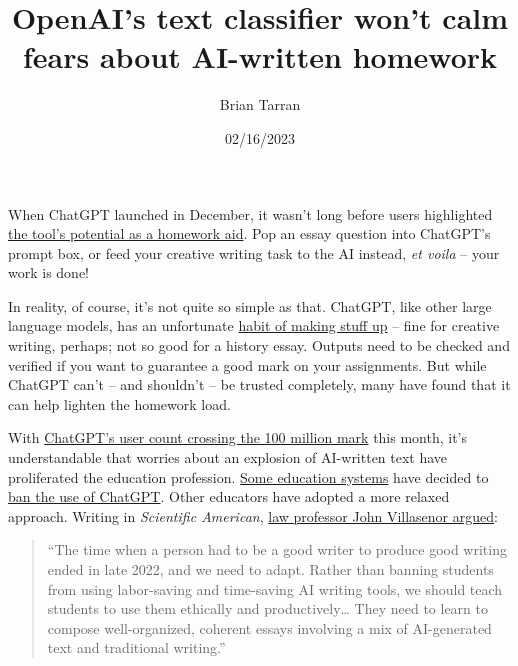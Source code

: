 \documentclass[
  letterpaper,
  DIV=11,
  numbers=noendperiod,
  oneside]{scrartcl}
\title{OpenAI's text classifier won't calm fears about AI-written
homework}
\author{Brian Tarran}
\date{02/16/2023}
\renewcommand*\contentsname{Table of contents}
\newcommand\contentsname{Table of contents}
\begin{document}
\maketitle
\ifdefined\Shaded\renewenvironment{Shaded}{\begin{tcolorbox}[boxrule=0pt, borderline west={3pt}{0pt}{shadecolor}, enhanced, frame hidden, interior hidden, sharp corners, breakable]}{\end{tcolorbox}}\fi

\renewcommand*\contentsname{Table of contents}
{
\hypersetup{linkcolor=}
\setcounter{tocdepth}{3}
\tableofcontents
}
When ChatGPT launched in December, it wasn't long before users
highlighted
\href{https://news.sky.com/story/the-ultimate-homework-cheat-how-teachers-are-facing-up-to-chatgpt-12780601}{the
tool's potential as a homework aid}. Pop an essay question into
ChatGPT's prompt box, or feed your creative writing task to the AI
instead, \emph{et voila} -- your work is done!

In reality, of course, it's not quite so simple as that. ChatGPT, like
other large language models, has an unfortunate
\href{https://realworlddatascience.net/news-and-views/editors-blog/posts/2023/01/27/talking-chatgpt.html}{habit
of making stuff up} -- fine for creative writing, perhaps; not so good
for a history essay. Outputs need to be checked and verified if you want
to guarantee a good mark on your assignments. But while ChatGPT can't --
and shouldn't -- be trusted completely, many have found that it can help
lighten the homework load.

With
\href{https://www.theguardian.com/technology/2023/feb/02/chatgpt-100-million-users-open-ai-fastest-growing-app}{ChatGPT's
user count crossing the 100 million mark} this month, it's
understandable that worries about an explosion of AI-written text have
proliferated the education profession.
\href{https://www.washingtonpost.com/education/2023/01/05/nyc-schools-ban-chatgpt/}{Some
education systems} have decided to
\href{https://www.smh.com.au/national/nsw/can-you-tell-between-a-year-6-student-and-ai-teachers-say-they-can-20230120-p5ce5s.html}{ban
the use of ChatGPT}. Other educators have adopted a more relaxed
approach. Writing in \emph{Scientific American},
\href{https://www.scientificamerican.com/article/how-chatgpt-can-improve-education-not-threaten-it/}{law
professor John Villasenor argued}:

\begin{quote}
``The time when a person had to be a good writer to produce good writing
ended in late 2022, and we need to adapt. Rather than banning students
from using labor-saving and time-saving AI writing tools, we should
teach students to use them ethically and productively\ldots{} They need
to learn to compose well-organized, coherent essays involving a mix of
AI-generated text and traditional writing.''
\end{quote}
\end{document}
